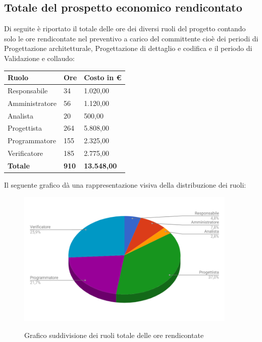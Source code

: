 \documentclass[PianoDiProgetto.tex]{subfiles}
\begin{document}
\subsection{Totale del prospetto economico rendicontato}
Di seguite è riportato il totale delle ore dei diversi ruoli del progetto contando solo le ore rendicontate nel preventivo a carico del committente cioè dei periodi di Progettazione architetturale, Progettazione di dettaglio e codifica e il periodo di Validazione e collaudo:
\begin{center}
	\begin{table}[htbp]
		\centering
		\renewcommand\arraystretch{1.5}
		\begin{tabularx}{\textwidth}{p{5cm}|p{4cm}|p{4cm}}
			\hline
			\textbf{Ruolo} & \textbf{Ore} & \textbf{Costo in \euro} \\
			\hline
			Responsabile & 34 & 1.020,00 \\
			\hline
			Amministratore & 56 & 1.120,00 \\
			\hline
			Analista & 20 & 500,00 \\
			\hline
			Progettista & 264 & 5.808,00 \\
			\hline
			Programmatore & 155 & 2.325,00 \\
			\hline
			Verificatore & 185 & 2.775,00 \\
			\hline
			\textbf{Totale} & \textbf{910} & \textbf{13.548,00}\\
			\hline
		\end{tabularx}
	\end{table} 
\end{center}
Il seguente grafico dà una rappresentazione visiva della distribuzione dei ruoli:
\begin{figure}[h]
	\centering
	\includegraphics[width=10.5cm]{images/prospettoEconomico/totRen.png}
	\label{fig:foo}
	\caption{Grafico suddivisione dei ruoli totale delle ore rendicontate}
\end{figure} 
\clearpage
\end{document}
